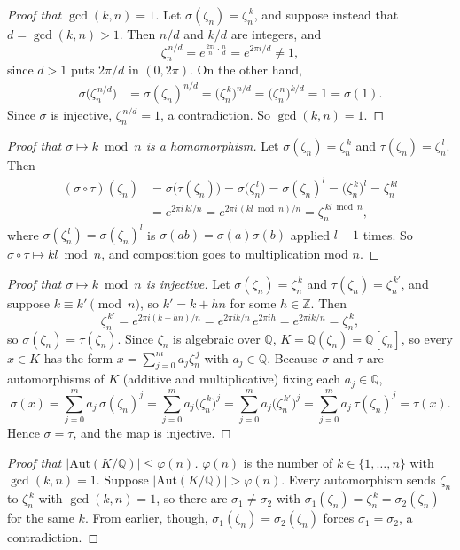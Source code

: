\documentclass[11pt]{article}
\begin{document}
\begin{proof}[Proof that $\gcd(k,n)=1$]
Let $\sigma(\zeta_n)=\zeta_n^{\,k}$, and suppose instead that
$d=\gcd(k,n)>1$. Then $n/d$ and $k/d$ are integers, and
\[
  \zeta_n^{\,n/d} = e^{\frac{2\pi i}{n}\cdot\frac{n}{d}} = e^{2\pi i/d} \neq 1,
\]
since $d>1$ puts $2\pi/d$ in $(0,2\pi)$. On the other hand,
\begin{align*}
  \sigma\bigl(\zeta_n^{\,n/d}\bigr)
    &= \sigma(\zeta_n)^{n/d}
     = \bigl(\zeta_n^{\,k}\bigr)^{n/d}
     = \bigl(\zeta_n^{\,n}\bigr)^{k/d}
     = 1 = \sigma(1).
\end{align*}
Since $\sigma$ is injective, $\zeta_n^{\,n/d}=1$, a contradiction. So
$\gcd(k,n)=1$.
\end{proof}
\begin{proof}[Proof that $\sigma\mapsto k \bmod n$ is a homomorphism]
Let $\sigma(\zeta_n)=\zeta_n^{\,k}$ and $\tau(\zeta_n)=\zeta_n^{\,l}$. Then
\begin{align*}
  (\sigma\circ\tau)(\zeta_n)
    &= \sigma\bigl(\tau(\zeta_n)\bigr)
     = \sigma\bigl(\zeta_n^{\,l}\bigr)
     = \sigma(\zeta_n)^{l}
     = \bigl(\zeta_n^{\,k}\bigr)^{l}
     = \zeta_n^{\,kl} \\
    &= e^{2\pi i\,kl/n}
     = e^{2\pi i\,(kl \bmod n)/n}
     = \zeta_n^{\,kl \bmod n},
\end{align*}
where $\sigma(\zeta_n^{\,l})=\sigma(\zeta_n)^{l}$ is
$\sigma(ab)=\sigma(a)\sigma(b)$ applied $l-1$ times. So
$\sigma\circ\tau\mapsto kl \bmod n$, and composition goes to multiplication
mod $n$.
\end{proof}
\begin{proof}[Proof that $\sigma\mapsto k \bmod n$ is injective]
Let $\sigma(\zeta_n)=\zeta_n^{\,k}$ and $\tau(\zeta_n)=\zeta_n^{\,k'}$, and
suppose $k\equiv k' \pmod n$, so $k'=k+hn$ for some $h\in\mathbb{Z}$. Then
\[
  \zeta_n^{\,k'} = e^{2\pi i(k+hn)/n}
    = e^{2\pi i k/n}\, e^{2\pi i h}
    = e^{2\pi i k/n} = \zeta_n^{\,k},
\]
so $\sigma(\zeta_n)=\tau(\zeta_n)$. Since $\zeta_n$ is algebraic over
$\mathbb{Q}$, $K=\mathbb{Q}(\zeta_n)=\mathbb{Q}[\zeta_n]$, so every $x\in K$
has the form $x=\sum_{j=0}^{m} a_j\zeta_n^{\,j}$ with $a_j\in\mathbb{Q}$.
Because $\sigma$ and $\tau$ are automorphisms of $K$ (additive and
multiplicative) fixing each $a_j\in\mathbb{Q}$,
\[
  \sigma(x) = \sum_{j=0}^{m} a_j\,\sigma(\zeta_n)^{j}
    = \sum_{j=0}^{m} a_j\bigl(\zeta_n^{\,k}\bigr)^{j}
    = \sum_{j=0}^{m} a_j\bigl(\zeta_n^{\,k'}\bigr)^{j}
    = \sum_{j=0}^{m} a_j\,\tau(\zeta_n)^{j}
    = \tau(x).
\]
Hence $\sigma=\tau$, and the map is injective.
\end{proof}
\begin{proof}[Proof that $\lvert\mathrm{Aut}(K/\mathbb{Q})\rvert\le\varphi(n)$]
$\varphi(n)$ is the number of $k\in\{1,\dots,n\}$ with $\gcd(k,n)=1$.
Suppose $\lvert\mathrm{Aut}(K/\mathbb{Q})\rvert>\varphi(n)$. Every
automorphism sends $\zeta_n$ to $\zeta_n^{\,k}$ with $\gcd(k,n)=1$, so there
are $\sigma_1\ne\sigma_2$ with $\sigma_1(\zeta_n)=\zeta_n^{\,k}=\sigma_2(\zeta_n)$
for the same $k$. From earlier, though, $\sigma_1(\zeta_n)=\sigma_2(\zeta_n)$
forces $\sigma_1=\sigma_2$, a contradiction.
\end{proof}
\end{document}
